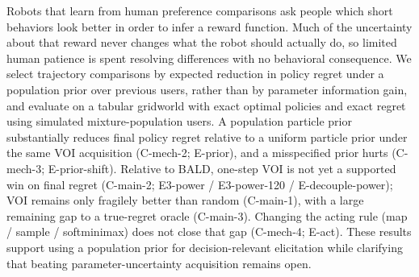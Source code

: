 Robots that learn from human preference comparisons ask people which short
behaviors look better in order to infer a reward function. Much of the
uncertainty about that reward never changes what the robot should actually do,
so limited human patience is spent resolving differences with no behavioral
consequence.
We select trajectory comparisons by expected reduction in policy regret under a
population prior over previous users, rather than by parameter information gain,
and evaluate on a tabular gridworld with exact optimal policies and exact regret
using simulated mixture-population users.
A population particle prior substantially reduces final policy regret relative to
a uniform particle prior under the same VOI acquisition
(C-mech-2; E-prior), and a misspecified prior hurts
(C-mech-3; E-prior-shift).
Relative to BALD, one-step VOI is not yet a supported win on final regret
(C-main-2; E3-power / E3-power-120 / E-decouple-power);
VOI remains only fragilely better than random (C-main-1), with a large remaining
gap to a true-regret oracle (C-main-3).
Changing the acting rule (map / sample / softminimax) does not close that gap
(C-mech-4; E-act).
These results support using a population prior for decision-relevant elicitation
while clarifying that beating parameter-uncertainty acquisition remains open.

